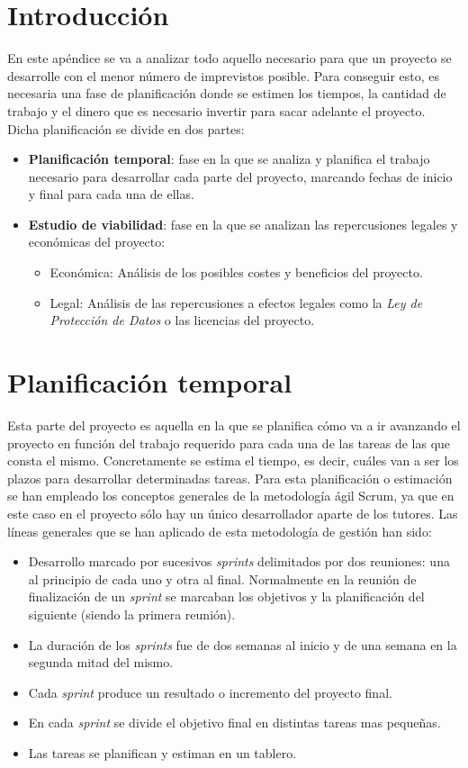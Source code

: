 
\section{Introducción}
En este apéndice se va a analizar todo aquello necesario para que un proyecto se desarrolle con el menor número de imprevistos posible. Para conseguir esto, es necesaria una fase de planificación donde se estimen los tiempos, la cantidad de trabajo y el dinero que es necesario invertir para sacar adelante el proyecto.
Dicha planificación se divide en dos partes:
\begin{itemize}
	\item \textbf{Planificación temporal}: fase en la que se analiza y planifica el trabajo necesario para desarrollar cada parte del proyecto, marcando fechas de inicio y final para cada una de ellas.
	\item \textbf{Estudio de viabilidad}: fase en la que se analizan las repercusiones legales y económicas del proyecto:
	\begin{itemize}
		\item Económica: Análisis de los posibles costes y beneficios del proyecto.
		\item Legal: Análisis de las repercusiones a efectos legales como la \textit{Ley de Protección de Datos} o las licencias del proyecto.
	\end{itemize}
\end{itemize}

\section{Planificación temporal}
Esta parte del proyecto es aquella en la que se planifica cómo va a ir avanzando el proyecto en función del trabajo requerido para cada una de las tareas de las que consta el mismo.
Concretamente se estima el tiempo, es decir, cuáles van a ser los plazos para desarrollar determinadas tareas.
Para esta planificación o estimación se han empleado los conceptos generales de la metodología ágil Scrum, ya que en este caso en el proyecto sólo hay un único desarrollador aparte de los tutores. Las líneas generales que se han aplicado de esta metodología de gestión han sido:
\begin{itemize}
	\tightlist
	\item
	Desarrollo marcado por sucesivos \emph{sprints} delimitados por dos reuniones: una al principio de cada uno y otra al final. Normalmente en la reunión de finalización de un \emph{sprint} se marcaban los objetivos y la planificación del siguiente (siendo la primera reunión).
	\item
	La duración de los \emph{sprints} fue de dos semanas al inicio y de una semana en la segunda mitad del mismo.
	\item
	Cada \emph{sprint} produce un resultado o incremento del proyecto final.
	\item
	En cada \emph{sprint} se divide el objetivo final en distintas tareas mas pequeñas.
	\item
	Las tareas se planifican y estiman en un tablero.
\end{itemize}

